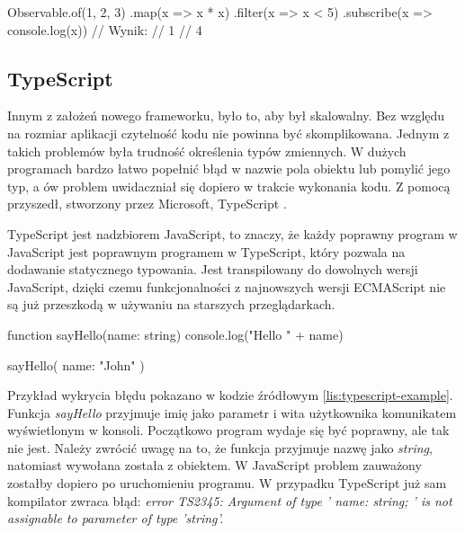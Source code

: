 	\begin{code}[
		language=javascript,
		caption={Przykład użycia RxJS (źródło: opracowanie własne)},
		label={lis:rxjs-example},
	]
Observable.of(1, 2, 3)
    .map(x => x * x)
    .filter(x => x < 5)
    .subscribe(x => console.log(x))
// Wynik:
// 1
// 4
	\end{code}	
	
	\subsection{TypeScript}
	Innym z założeń nowego frameworku, było to, aby był skalowalny. Bez względu na rozmiar aplikacji czytelność kodu nie powinna być skomplikowana. Jednym z takich problemów była trudność określenia typów zmiennych. W dużych programach bardzo łatwo popełnić błąd w nazwie pola obiektu lub pomylić jego typ, a ów problem uwidaczniał się dopiero w trakcie wykonania kodu. Z pomocą przyszedł, stworzony przez Microsoft, TypeScript \cite{typescript-doc}.\par
	
	TypeScript jest nadzbiorem JavaScript, to znaczy, że każdy poprawny program w JavaScript jest poprawnym programem w TypeScript, który pozwala na dodawanie statycznego typowania. Jest transpilowany do dowolnych wersji JavaScript, dzięki czemu funkcjonalności z najnowszych wersji ECMAScript nie są już przeszkodą w używaniu na starszych przeglądarkach.\par
	
	\begin{code}[
		language=javascript,
		caption={Przykład wykrycia błędu w TypeScript (źródło: opracowanie własne)},
		label={lis:typescript-example},
	]
function sayHello(name: string) {
  console.log("Hello " + name)
}

sayHello({ name: "John" })
	\end{code}		
	
	Przykład wykrycia błędu pokazano w kodzie źródłowym \ref{lis:typescript-example}. Funkcja \textit{sayHello} przyjmuje imię jako parametr i wita użytkownika komunikatem wyświetlonym w konsoli. Początkowo program wydaje się być poprawny, ale tak nie jest. Należy zwrócić uwagę na to, że funkcja przyjmuje nazwę jako \textit{string}, natomiast wywołana została z obiektem. W JavaScript problem zauważony zostałby dopiero po uruchomieniu programu. W przypadku TypeScript już sam kompilator zwraca błąd: \textit{error TS2345: Argument of type '{ name: string; }' is not assignable to parameter of type 'string'.} 
	

